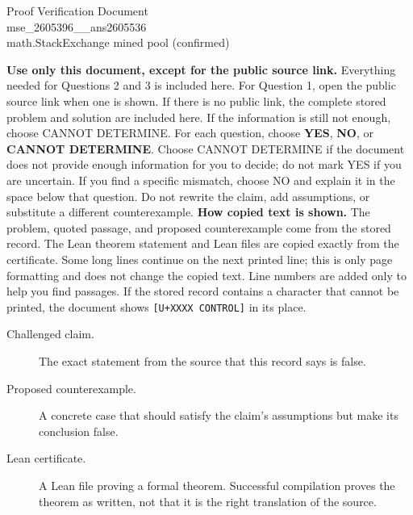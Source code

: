 \documentclass[11pt]{article}
\begin{document}
\begin{center}{\LARGE Proof Verification Document}\\[2pt]{\large mse\_2605396\_\_ans2605536}\\[2pt]{\small math.StackExchange mined pool (confirmed)}\end{center}
\begin{center}\end{center}
\textbf{Use only this document, except for the public source link.} Everything needed for Questions 2 and 3 is included here. For Question 1, open the public source link when one is shown. If there is no public link, the complete stored problem and solution are included here. If the information is still not enough, choose CANNOT DETERMINE.
For each question, choose \textbf{YES}, \textbf{NO}, or \textbf{CANNOT DETERMINE}. Choose CANNOT DETERMINE if the document does not provide enough information for you to decide; do not mark YES if you are uncertain. If you find a specific mismatch, choose NO and explain it in the space below that question. Do not rewrite the claim, add assumptions, or substitute a different counterexample.
\textbf{How copied text is shown.} The problem, quoted passage, and proposed counterexample come from the stored record. The Lean theorem statement and Lean files are copied exactly from the certificate. Some long lines continue on the next printed line; this is only page formatting and does not change the copied text. Line numbers are added only to help you find passages. If the stored record contains a character that cannot be printed, the document shows \texttt{[U+XXXX CONTROL]} in its place.
\begin{description}
\item[Challenged claim.] The exact statement from the source that this record says is false.
\item[Proposed counterexample.] A concrete case that should satisfy the claim's assumptions but make its conclusion false.
\item[Lean certificate.] A Lean file proving a formal theorem. Successful compilation proves the theorem as written, not that it is the right translation of the source.
\end{description}
\end{document}
